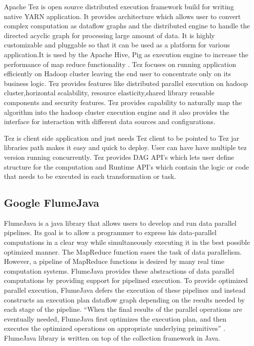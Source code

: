     Apache Tez is open source distributed execution framework build
    for writing native YARN application. It provides architecture
    which allows user to convert complex computation as dataflow
    graphs and the distributed engine to handle the directed acyclic
    graph for processing large amount of data. It is highly
    customizable and pluggable so that it can be used as a platform
    for various application.It is used by the Apache Hive, Pig as
    execution engine to increase the performance of map reduce
    functionality \cite{www-apache-tez}. Tez focuses on running
    application efficiently on Hadoop cluster leaving the end user to
    concentrate only on its business logic. Tez provides features like
    distributed parallel execution on hadoop cluster,horizontal
    scalability, resource elasticity,shared library reusable
    components and security features. Tez provides capability to
    naturally map the algorithm into the hadoop cluster execution
    engine and it also provides the interface for interaction with
    different data sources and configurations.
	
    Tez is client side application and just needs Tez client to be
    pointed to Tez jar libraries path makes it easy and quick to
    deploy. User can have have multiple tez version running
    concurrently. Tez provides DAG API's which lets user define
    structure for the computation and Runtime API's which contain the
    logic or code that needs to be executed in each transformation or
    task.

\subsection{Google FlumeJava}

    FlumeJava \cite{www-flumejava-google} is a java library that
    allows users to develop and run data parallel pipelines. Its goal
    is to allow a programmer to express his data-parallel computations
    in a clear way while simultaneously executing it in the best
    possible optimized manner. The MapReduce function eases the task
    of data parallelism. However, a pipeline of MapReduce functions is
    desired by many real time computation systems. FlumeJava provides
    these abstractions of data parallel computations by providing
    support for pipelined execution. To provide optimized parallel
    execution, FlumeJava defers the execution of these pipelines and
    instead constructs an execution plan dataflow graph depending on
    the results needed by each stage of the pipeline. ``When the final
    results of the parallel operations are eventually needed,
    FlumeJava first optimizes the execution plan, and then executes
    the optimized operations on appropriate underlying primitives''
    \cite{flumejava-paper}. FlumeJava library is written on top of
    the collection framework in Java.

